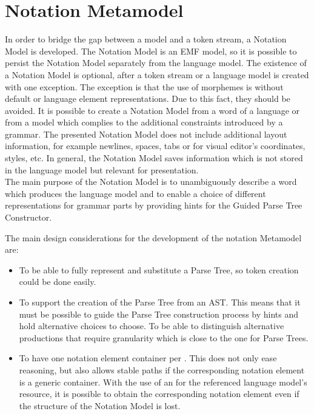 \section{Notation Metamodel} \label{chp:NotMM}
In order to bridge the gap between a model and a token stream, a Notation Model is developed. The Notation Model is an EMF model, so it is possible to persist the Notation Model separately from the language model. The existence of a Notation Model is optional, after a token stream or a language model is created with one exception. The exception is that the use of morphemes is without default or language element representations. Due to this fact, they should be avoided. It is possible to create a Notation Model from a word of a language or from a model which complies to the additional constraints introduced by a grammar. The presented Notation Model does not include additional layout information, for example newlines, spaces, tabs or for visual editor's coordinates, styles, etc. In general, the Notation Model saves information which is not stored in the language model but relevant for presentation.\\

The main purpose of the Notation Model is to unambiguously describe a word which produces the language model and to enable a choice of different representations for grammar parts by providing hints for the Guided Parse Tree Constructor.

The main design considerations for the development of the notation Metamodel are:
\begin{itemize}
	\item To be able to fully represent and substitute a Parse Tree, so token creation could be done easily.
	\item To support the creation of the Parse Tree from an AST. This means that it must be possible to guide the Parse Tree construction process by hints and hold alternative choices to choose. To be able to distinguish alternative productions that require granularity which is close to the one for Parse Trees.
	\item To have one notation element container per . This does not only ease reasoning, but also allows stable paths if the corresponding notation element is a generic container. With the use of an  for the referenced language model's resource, it is possible to obtain the corresponding notation element even if the structure of the Notation Model is lost. 
\end{itemize}

